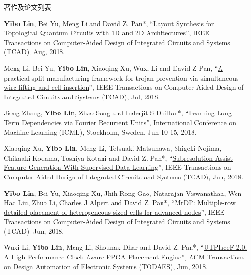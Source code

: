 \begin{rSection}{著作及论文列表}
\begin{description}[font=\normalfont, rightmargin=2em]
\item[{[J29]}]{
        \textbf{Yibo Lin}, Bei Yu, Meng Li and David Z. Pan*, 
    ``\href{https://doi.org/10.1109/TCAD.2017.2760511}{Layout Synthesis for Topological Quantum Circuits with 1D and 2D Architectures}'', 
    IEEE Transactions on Computer-Aided Design of Integrated Circuits and Systems (TCAD), Aug, 2018.
    
}
            

\item[{[J28]}]{
        Meng Li, Bei Yu, \textbf{Yibo Lin}, Xiaoqing Xu, Wuxi Li and David Z Pan, 
    ``\href{https://doi.org/10.1109/TCAD.2018.2859402}{A practical split manufacturing framework for trojan prevention via simultaneous wire lifting and cell insertion}'', 
    IEEE Transactions on Computer-Aided Design of Integrated Circuits and Systems (TCAD), Jul, 2018.
    
}
            

\item[{[C27]}]{
        Jiong Zhang, \textbf{Yibo Lin}, Zhao Song and Inderjit S Dhillon*, 
    ``\href{https://arxiv.org/pdf/1803.06585.pdf}{Learning Long Term Dependencies via Fourier Recurrent Units}'', 
    International Conference on Machine Learning (ICML), Stockholm, Sweden, Jun 10-15, 2018.
    
}
            

\item[{[J26]}]{
        Xiaoqing Xu, \textbf{Yibo Lin}, Meng Li, Tetsuaki Matsunawa, Shigeki Nojima, Chikaaki Kodama, Toshiya Kotani and David Z. Pan*, 
    ``\href{https://doi.org/10.1109/TCAD.2017.2748029}{Subresolution Assist Feature Generation With Supervised Data Learning}'', 
    IEEE Transactions on Computer-Aided Design of Integrated Circuits and Systems (TCAD), Jun, 2018.
    
}
            

\item[{[J25]}]{
        \textbf{Yibo Lin}, Bei Yu, Xiaoqing Xu, Jhih-Rong Gao, Natarajan Viswanathan, Wen-Hao Liu, Zhuo Li, Charles J Alpert and David Z. Pan*, 
    ``\href{https://doi.org/10.1109/TCAD.2017.2748025}{MrDP: Multiple-row detailed placement of heterogeneous-sized cells for advanced nodes}'', 
    IEEE Transactions on Computer-Aided Design of Integrated Circuits and Systems (TCAD), Jun, 2018.
    
}
            

\item[{[J24]}]{
        Wuxi Li, \textbf{Yibo Lin}, Meng Li, Shounak Dhar and David Z. Pan*, 
    ``\href{https://doi.org/10.1145/3174849}{UTPlaceF 2.0: A High-Performance Clock-Aware FPGA Placement Engine}'', 
    ACM Transactions on Design Automation of Electronic Systems (TODAES), Jun, 2018.
    
}
\end{description}
\end{rSection}
